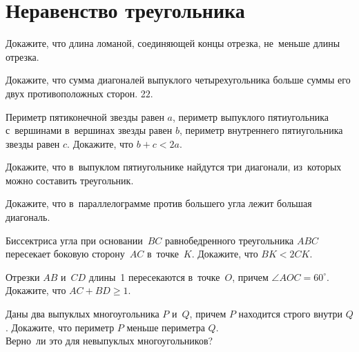 
\section*{Неравенство треугольника}


\begin{problems}

\item
Докажите, что длина ломаной, соединяющей концы отрезка, не~меньше длины отрезка.

\item
Докажите, что сумма диагоналей выпуклого четырехугольника больше суммы его двух
противоположных сторон.
2$2$.

\item
Периметр пятиконечной звезды равен $a$, периметр выпуклого пятиугольника
с~вершинами в~вершинах звезды равен $b$, периметр внутреннего пятиугольника
звезды равен $c$.
Докажите, что $b + c < 2 a$.

\item
Докажите, что в~выпуклом пятиугольнике найдутся три диагонали, из~которых можно
составить треугольник.

\item
Докажите, что в~параллелограмме против большего угла лежит большая диагональ.

\item
Биссектриса угла при основании~$BC$ равнобедренного треугольника $ABC$
пересекает боковую сторону~$AC$ в~точке~$K$.
Докажите, что $BK < 2 CK$.

\item
Отрезки $AB$ и~$CD$ длины~1 пересекаются в~точке~$O$, причем
$\angle AOC = 60^\circ$.
Докажите, что $AC + BD \geq 1$.

\item
\sp
Даны два выпуклых многоугольника $P$ и~$Q$, причем $P$ находится строго
внутри $Q$.
Докажите, что периметр $P$ меньше периметра $Q$.
\\
\sp
Верно~ли это для невыпуклых многоугольников?

\end{problems}

